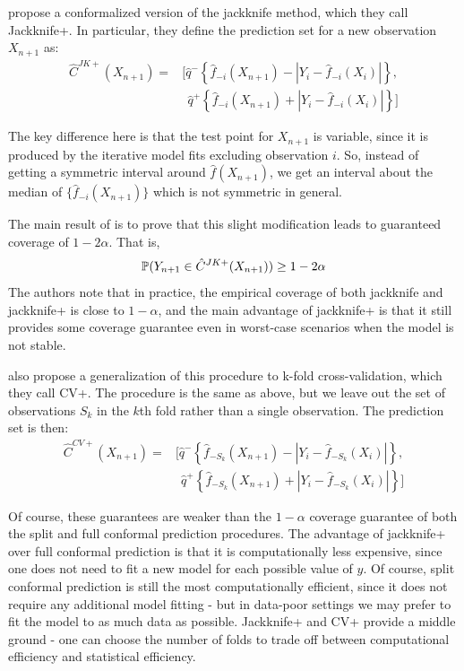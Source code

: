 \documentclass[a4paper, 12pt]{article}
\begin{document}
\textcite{barberPredictiveInferenceJackknife2020} propose a conformalized version of the jackknife method, which they call Jackknife+. In particular, they define the prediction set for a new observation $X_{n+1}$ as:
\begin{align*}
    \hat{C}^{JK+}(X_{n+1}) =
     & \Big[ \hat{q}^{-}\left\{ \hat{f}_{-i}(X_{n+1}) - |Y_i - \hat{f}_{-i}(X_i)|\right\},   \\
     & ~~ \hat{q}^{+}\left\{ \hat{f}_{-i}(X_{n+1}) + |Y_i - \hat{f}_{-i}(X_i)|\right\} \Big]
\end{align*}

The key difference here is that the test point for $X_{n+1}$ is variable, since it is produced by the iterative model fits excluding observation $i$. So, instead of getting a symmetric interval around $\hat{f}(X_{n+1})$, we get an interval about the median of $\{\hat{f}_{-i}(X_{n+1})\}$ which is not symmetric in general.

The main result of \textcite{barberPredictiveInferenceJackknife2020} is to prove that this slight modification leads to guaranteed coverage of $1-2\alpha$. That is,
\[ \P(Y_{n+1} \in \hat{C}^{JK+}(X_{n+1})) \geq 1 - 2\alpha \]
The authors note that in practice, the empirical coverage of both jackknife and jackknife+ is close to $1-\alpha$, and the main advantage of jackknife+ is that it still provides some coverage guarantee even in worst-case scenarios when the model is not stable.

\textcite{barberPredictiveInferenceJackknife2020} also propose a generalization of this procedure to k-fold cross-validation, which they call CV+. The procedure is the same as above, but we leave out the set of observations $S_k$ in the $k$th fold rather than a single observation. The prediction set is then:
\begin{align*}
    \hat{C}^{CV+}(X_{n+1}) =
     & \Big[ \hat{q}^{-}\left\{ \hat{f}_{-S_k}(X_{n+1}) - |Y_i - \hat{f}_{-S_k}(X_i)|\right\},   \\
     & ~~ \hat{q}^{+}\left\{ \hat{f}_{-S_k}(X_{n+1}) + |Y_i - \hat{f}_{-S_k}(X_i)|\right\} \Big]
\end{align*}

Of course, these guarantees are weaker than the $1-\alpha$ coverage guarantee of both the split and full conformal prediction procedures.  The advantage of jackknife+ over full conformal prediction is that it is computationally less expensive, since one does not need to fit a new model for each possible value of $y$. Of course, split conformal prediction is still the most computationally efficient, since it does not require any additional model fitting - but in data-poor settings we may prefer to fit the model to as much data as possible. Jackknife+ and CV+ provide a middle ground - one can choose the number of folds to trade off between computational efficiency and statistical efficiency.
\end{document}
